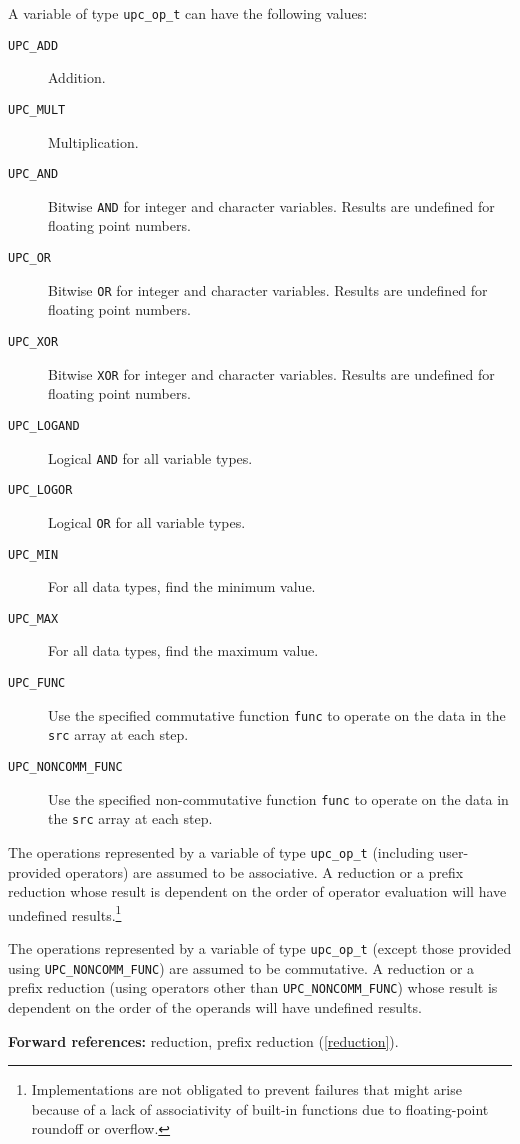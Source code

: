 \npf
\label{upc-op-t-item}
A variable of type {\tt upc\_op\_t} can have the following values:
\begin{description}
\item[{\tt UPC\_ADD}]
Addition.
\item[{\tt UPC\_MULT}]
Multiplication.
\item[{\tt UPC\_AND}]
Bitwise {\tt AND} for integer and character variables.
Results are undefined for floating point numbers.
\item[{\tt UPC\_OR}]
Bitwise {\tt OR} for integer and character variables.
Results are undefined for floating point numbers.
\item[{\tt UPC\_XOR}]
Bitwise {\tt XOR} for integer and character variables.
Results are undefined for floating point numbers.
\item[{\tt UPC\_LOGAND}]
Logical {\tt AND} for all variable types.
\item[{\tt UPC\_LOGOR}]
Logical {\tt OR} for all variable types.
\item[{\tt UPC\_MIN}]
For all data types, find the minimum value.
\item[{\tt UPC\_MAX}]
For all data types, find the maximum value.
\item[{\tt UPC\_FUNC}]
Use the specified commutative function {\tt func} to operate
on the data in the {\tt src} array at each step.
\item[{\tt UPC\_NONCOMM\_FUNC}]
Use the specified non-commutative function {\tt func} to
operate on the data in the {\tt src} array at each step.
\end{description}

\np The operations represented by a variable of type {\tt upc\_op\_t}
(including user-provided operators) are assumed to be associative.
A reduction or a prefix reduction whose result is dependent on the
order of operator evaluation will have undefined results.\footnote{
Implementations are not obligated to prevent failures that
might arise because of a lack of associativity of built-in functions
due to floating-point roundoff or overflow.}

\np The operations represented by a variable of type {\tt upc\_op\_t}
(except those provided using {\tt UPC\_NONCOMM\_FUNC}) are assumed
to be commutative.  A reduction or a prefix reduction (using operators
other than {\tt UPC\_NONCOMM\_FUNC}) whose result is dependent on
the order of the operands will have undefined results.

{\bf Forward references:} reduction, prefix reduction (\ref{reduction}).

